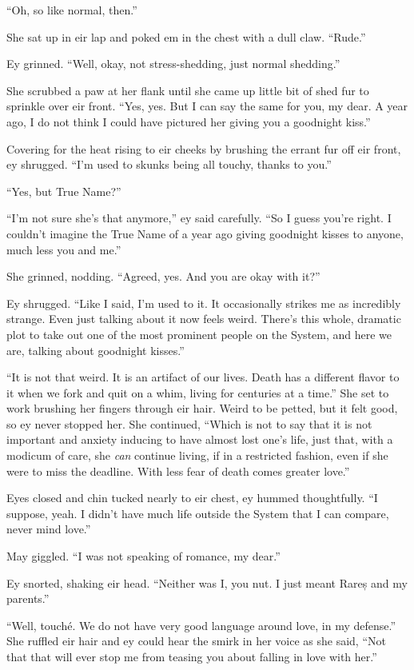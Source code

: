 ``Oh, so like normal, then.''

She sat up in eir lap and poked em in the chest with a dull claw. ``Rude.''

Ey grinned. ``Well, okay, not stress-shedding, just normal shedding.''

She scrubbed a paw at her flank until she came up little bit of shed fur to sprinkle over eir front. ``Yes, yes. But I can say the same for you, my dear. A year ago, I do not think I could have pictured her giving you a goodnight kiss.''

Covering for the heat rising to eir cheeks by brushing the errant fur off eir front, ey shrugged. ``I'm used to skunks being all touchy, thanks to you.''

``Yes, but True Name?''

``I'm not sure she's that anymore,'' ey said carefully. ``So I guess you're right. I couldn't imagine the True Name of a year ago giving goodnight kisses to anyone, much less you and me.''

She grinned, nodding. ``Agreed, yes. And you are okay with it?''

Ey shrugged. ``Like I said, I'm used to it. It occasionally strikes me as incredibly strange. Even just talking about it now feels weird. There's this whole, dramatic plot to take out one of the most prominent people on the System, and here we are, talking about goodnight kisses.''

``It is not that weird. It is an artifact of our lives. Death has a different flavor to it when we fork and quit on a whim, living for centuries at a time.'' She set to work brushing her fingers through eir hair. Weird to be petted, but it felt good, so ey never stopped her. She continued, ``Which is not to say that it is not important and anxiety inducing to have almost lost one's life, just that, with a modicum of care, she \emph{can} continue living, if in a restricted fashion, even if she were to miss the deadline. With less fear of death comes greater love.''

Eyes closed and chin tucked nearly to eir chest, ey hummed thoughtfully. ``I suppose, yeah. I didn't have much life outside the System that I can compare, never mind love.''

May giggled. ``I was not speaking of romance, my dear.''

Ey snorted, shaking eir head. ``Neither was I, you nut. I just meant Rareș and my parents.''

``Well, touché. We do not have very good language around love, in my defense.'' She ruffled eir hair and ey could hear the smirk in her voice as she said, ``Not that that will ever stop me from teasing you about falling in love with her.''

